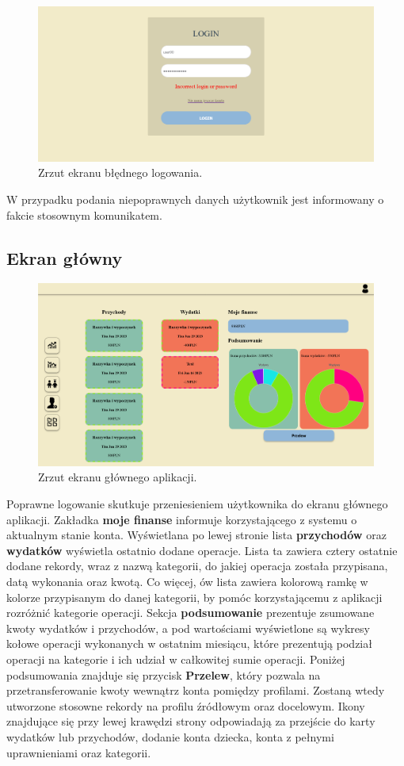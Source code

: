 \documentclass[12pt,a4paper,oneside]{article}
\begin{document}
\begin{figure}[H]
    \centering
    \includegraphics[width=\hsize,keepaspectratio]{images/login_failed.png}
    \caption{Zrzut ekranu błędnego logowania.}
\end{figure}
W przypadku podania niepoprawnych danych użytkownik jest informowany o fakcie
stosownym komunikatem.

\subsection{Ekran główny}
\begin{figure}[H]
    \centering
    \includegraphics[width=\hsize,keepaspectratio]{images/profile.png}
    \caption{Zrzut ekranu głównego aplikacji.}
\end{figure}
Poprawne logowanie skutkuje przeniesieniem użytkownika do ekranu głównego
aplikacji. Zakładka \textbf{moje finanse} informuje korzystającego z systemu o
aktualnym stanie konta. Wyświetlana po lewej stronie lista \textbf{przychodów}
oraz \textbf{wydatków} wyświetla ostatnio dodane operacje. Lista ta zawiera 
cztery ostatnie dodane rekordy, wraz z nazwą kategorii, do jakiej operacja
została przypisana, datą wykonania oraz kwotą. Co więcej, ów lista zawiera
kolorową ramkę w kolorze przypisanym do danej kategorii, by pomóc korzystającemu
z aplikacji rozróżnić kategorie operacji. Sekcja \textbf{podsumowanie}
prezentuje zsumowane kwoty wydatków i przychodów, a pod wartościami wyświetlone
są wykresy kołowe operacji wykonanych w ostatnim miesiącu,
które prezentują podział operacji na kategorie i ich udział w
całkowitej sumie operacji. Poniżej podsumowania znajduje się przycisk
\textbf{Przelew}, który pozwala na przetransferowanie kwoty wewnątrz konta
pomiędzy profilami. Zostaną wtedy utworzone stosowne rekordy na profilu źródłowym
oraz docelowym. Ikony znajdujące się przy lewej krawędzi strony odpowiadają za
przejście do karty wydatków lub przychodów, dodanie konta dziecka, konta
z pełnymi uprawnieniami oraz kategorii.
\end{document}
